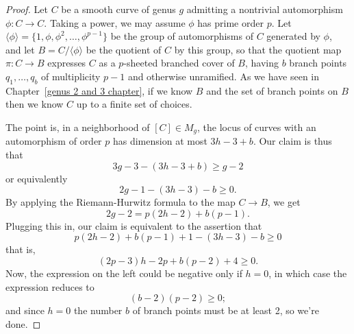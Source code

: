 \begin{proof} 
Let $C$ be a smooth curve of genus $g$ admitting a nontrivial automorphism $\phi : C \to C$. Taking a power, we may assume $\phi$ has prime order $p$. 
Let $\langle \phi \rangle = \{1, \phi, \phi^2,\dots,\phi^{p-1} \}$ be the group of automorphisms of $C$ generated by $\phi$, and let $B = C/\langle \phi \rangle $ be the quotient of $C$ by this group, so that the quotient map $\pi : C \to B$ expresses $C$ as a $p$-sheeted branched cover of $B$, having $b$ branch points $q_1,\dots, q_b$ of multiplicity $p-1$ and otherwise unramified.
As we have seen in Chapter~\ref{genus 2 and 3 chapter}, if we know $B$ and the set
of branch points on $B$ then we know $C$ up to a finite set of choices. 

The point is, in a neighborhood of $[C] \in M_g$, the locus of curves with an automorphism of order $p$ has dimension at most $3h-3 + b$. Our claim is thus that
$$
3g-3 - (3h-3+b) \geq g-2
$$
or equivalently
$$
2g - 1 - (3h-3) - b \geq 0.
$$
By applying the Riemann-Hurwitz formula to the map $C \to B$, we get
$$
2g-2 = p(2h-2) + b(p-1).
$$
Plugging this in, our claim is equivalent to the assertion that
$$
p(2h-2) + b(p-1) + 1 - (3h-3) - b \geq 0
$$
that is,
$$
(2p-3)h -2p + b(p-2) + 4 \geq 0.
$$
Now, the expression on the left could be negative only if $h=0$, in which case the expression reduces to
$$
(b-2)(p-2) \geq 0;
$$
and since $h=0$ the number $b$ of branch points must be at least 2, so we're done.
\end{proof}

